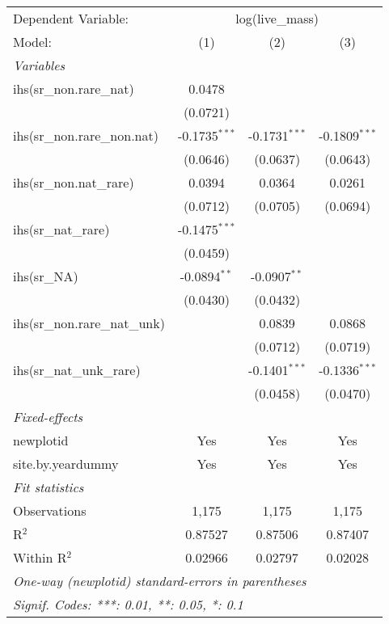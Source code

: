 \begin{tabular}{lccc}
\tabularnewline\midrule\midrule
Dependent Variable:&\multicolumn{3}{c}{log(live\_mass)}\\
Model:&(1) & (2) & (3)\\
\midrule \emph{Variables}&   &   &  \\
ihs(sr\_non.rare\_nat)&0.0478 &    &   \\
  &(0.0721) &    &   \\
ihs(sr\_non.rare\_non.nat)&-0.1735$^{***}$ & -0.1731$^{***}$ & -0.1809$^{***}$\\
  &(0.0646) & (0.0637) & (0.0643)\\
ihs(sr\_non.nat\_rare)&0.0394 & 0.0364 & 0.0261\\
  &(0.0712) & (0.0705) & (0.0694)\\
ihs(sr\_nat\_rare)&-0.1475$^{***}$ &    &   \\
  &(0.0459) &    &   \\
ihs(sr\_NA)&-0.0894$^{**}$ & -0.0907$^{**}$ &   \\
  &(0.0430) & (0.0432) &   \\
ihs(sr\_non.rare\_nat\_unk)&   & 0.0839 & 0.0868\\
  &   & (0.0712) & (0.0719)\\
ihs(sr\_nat\_unk\_rare)&   & -0.1401$^{***}$ & -0.1336$^{***}$\\
  &   & (0.0458) & (0.0470)\\
\midrule \emph{Fixed-effects}&   &   &  \\
newplotid & Yes & Yes & Yes\\
site.by.yeardummy & Yes & Yes & Yes\\
\midrule \emph{Fit statistics}&  & & \\
Observations & 1,175&1,175&1,175\\
R$^2$ & 0.87527&0.87506&0.87407\\
Within R$^2$ & 0.02966&0.02797&0.02028\\
\midrule\midrule\multicolumn{4}{l}{\emph{One-way (newplotid) standard-errors in parentheses}}\\
\multicolumn{4}{l}{\emph{Signif. Codes: ***: 0.01, **: 0.05, *: 0.1}}\\
\end{tabular}


